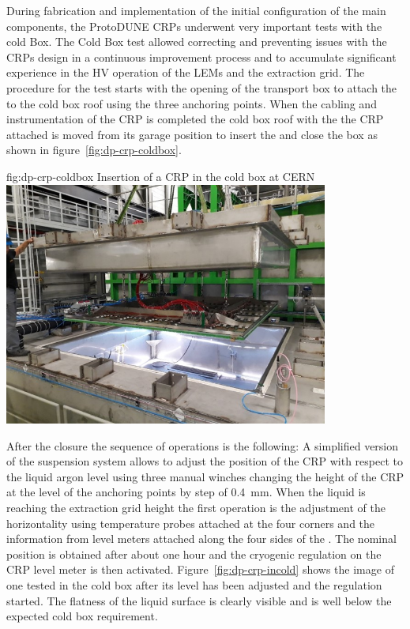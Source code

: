 During fabrication and  implementation of the initial configuration of the main components, the ProtoDUNE CRPs underwent very important tests with
the cold Box. The Cold Box test allowed correcting and preventing issues with the CRPs design in a continuous improvement process and to accumulate significant  experience in the HV operation of the LEMs and the extraction grid.
The procedure for the test starts with the opening of the transport box to attach the  to the cold box roof using the three anchoring points.
 When the cabling and instrumentation of the CRP is completed  the cold box roof with the the CRP attached is moved from its garage position to insert the  and close the box as shown in figure~\ref{fig:dp-crp-coldbox}. 
 
 \begin{dunefigure}
{fig:dp-crp-coldbox}
{Insertion of a  CRP in the cold box at CERN}
\includegraphics[width=0.8\textwidth]{graphics/CRP-coldbox}
\end{dunefigure}

 After the closure the sequence of operations is the following:
A simplified version of the suspension system allows to adjust the position of the CRP with respect to the liquid argon level using three manual winches changing the height of the CRP at the level of the anchoring points by step of \SI{0.4}{mm}.
 When the liquid is reaching the extraction grid height the first operation is the adjustment of the horizontality using temperature probes attached at  the four corners and the information from level meters attached along the four sides of the . The nominal position is obtained after about one hour and the cryogenic regulation on the CRP level meter is then activated. Figure~\ref{fig:dp-crp-incold} shows the image of one   tested in the cold box after its level has been adjusted and the regulation started. The flatness of the liquid surface is clearly visible and is well below the expected cold box requirement.

